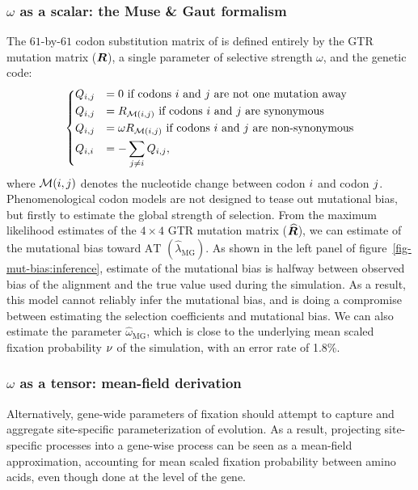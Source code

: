 \subsubsection{$\omega$ as a scalar: the Muse \& Gaut formalism}

The $61$-by-$61$ codon substitution matrix of \citet{Muse1994} is defined entirely by the \acrshort{GTR} mutation matrix ($\bm{R}$), a single parameter of selective strength $\omega$, and the genetic code:
\begin{equation}
    \begin{dcases}
        Q_{{i}, {j}} & = 0 \text{ if codons ${i}$ and ${j}$ are not one mutation away} \\
        Q_{{i}, {j}} & = R_{\mathcal{M}({i}, {j})} \text{ if codons ${i}$ and ${j}$ are synonymous} \\
        Q_{{i}, {j}} & = \omega R_{\mathcal{M}({i}, {j})} \text{ if codons ${i}$ and ${j}$ are non-synonymous} \\
        Q_{{i}, {i}} & = - \sum\limits_{{j} \neq {i}} Q_{{i}, {j}},
    \end{dcases}
    \label{eq:codon-muse-gaut}
\end{equation}
where $\mathcal{M}({i}, {j})$ denotes the nucleotide change between codon ${i}$ and codon ${j}$.
Phenomenological codon models are not designed to tease out mutational bias, but firstly to estimate the global strength of selection.
From the maximum likelihood estimates of the $4 \times 4$ \acrshort{GTR} mutation matrix ($\widehat{\bm{R}}$), we can estimate of the mutational bias toward $\mathrm{AT}$ $\left({\widehat{\lambda}_{\text{MG}}} \right)$.
As shown in the left panel of figure~\ref{fig-mut-bias:inference}, estimate of the mutational bias is halfway between observed bias of the alignment and the true value used during the simulation.
As a result, this model cannot reliably infer the mutational bias, and is doing a compromise between estimating the selection coefficients and mutational bias.
We can also estimate the parameter ${\widehat{\omega}_{\text{MG}}}$, which is close to the underlying mean scaled fixation probability $\nu$ of the simulation, with an error rate of 1.8\%.

\subsubsection{$\omega$ as a tensor: mean-field derivation}

Alternatively, gene-wide parameters of fixation should attempt to capture and aggregate site-specific parameterization of evolution.
As a result, projecting site-specific processes into a gene-wise process can be seen as a mean-field approximation, accounting for mean scaled fixation probability between amino acids, even though done at the level of the gene.

